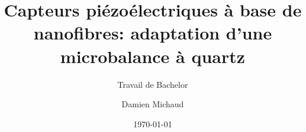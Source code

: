 \author{Damien Michaud}

\setfemale

\title{Capteurs piézoélectriques à base de nanofibres: adaptation d'une microbalance à quartz}

\subtitle{Travail de Bachelor}


\date{\today}

